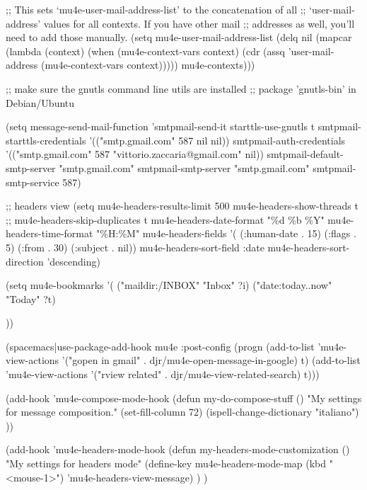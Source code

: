 \documentclass[presentation]{beamer}
\begin{document}
{{{{{{;; This sets `mu4e-user-mail-address-list' to the concatenation of all
;; `user-mail-address' values for all contexts. If you have other mail
;; addresses as well, you'll need to add those manually.
(setq mu4e-user-mail-address-list
      (delq nil
            (mapcar (lambda (context)
                      (when (mu4e-context-vars context)
                        (cdr (assq 'user-mail-address (mu4e-context-vars context)))))
                    mu4e-contexts)))

;; make sure the gnutls command line utils are installed
;; package 'gnutls-bin' in Debian/Ubuntu

(setq message-send-mail-function 'smtpmail-send-it
      starttls-use-gnutls t
      smtpmail-starttls-credentials '(("smtp.gmail.com" 587 nil nil))
      smtpmail-auth-credentials
      '(("smtp.gmail.com" 587 "vittorio.zaccaria@gmail.com" nil))
      smtpmail-default-smtp-server "smtp.gmail.com"
      smtpmail-smtp-server "smtp.gmail.com"
      smtpmail-smtp-service 587)

;; headers view
(setq mu4e-headers-results-limit 500
      mu4e-headers-show-threads t
      ;; mu4e-headers-skip-duplicates t
      mu4e-headers-date-format "\%d \%b \%Y"
      mu4e-headers-time-format "\%H:\%M"
      mu4e-headers-fields
      '( (:human-date     .  15)
         (:flags          .   5)
         (:from           .  30)
         (:subject        .  nil))
      mu4e-headers-sort-field :date
      mu4e-headers-sort-direction 'descending)

(setq mu4e-bookmarks
      '(
        ("maildir:/INBOX"                        "Inbox"               ?i)
        ("date:today..now"                       "Today"               ?t)

))

(spacemacs|use-package-add-hook mu4e
  :post-config
  (progn
    (add-to-list 'mu4e-view-actions '("gopen in gmail" . djr/mu4e-open-message-in-google) t)
    (add-to-list 'mu4e-view-actions '("rview related" . djr/mu4e-view-related-search) t)))


(add-hook 'mu4e-compose-mode-hook
          (defun my-do-compose-stuff ()
            "My settings for message composition."
            (set-fill-column 72)
            (ispell-change-dictionary "italiano")
            ))

(add-hook 'mu4e-headers-mode-hook
          (defun my-headers-mode-customization ()
            "My settings for headers mode"
            (define-key mu4e-headers-mode-map (kbd "<mouse-1>") 'mu4e-headers-view-message)
            )
          )


}}}}}}
\end{document}
